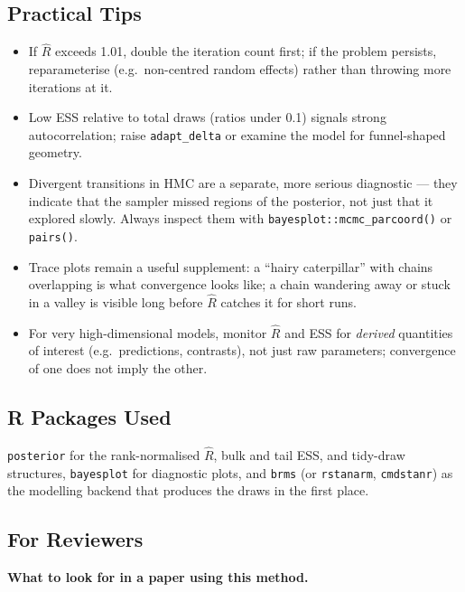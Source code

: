 \documentclass[
]{article}
\providecommand{\tightlist}{%
  \setlength{\itemsep}{0pt}\setlength{\parskip}{0pt}}
\begin{document}
\subsection{Practical Tips}\label{practical-tips}

\begin{itemize}
\tightlist
\item
  If \(\hat R\) exceeds 1.01, double the iteration count first; if the
  problem persists, reparameterise (e.g.~non-centred random effects)
  rather than throwing more iterations at it.
\item
  Low ESS relative to total draws (ratios under 0.1) signals strong
  autocorrelation; raise \texttt{adapt\_delta} or examine the model for
  funnel-shaped geometry.
\item
  Divergent transitions in HMC are a separate, more serious diagnostic
  --- they indicate that the sampler missed regions of the posterior,
  not just that it explored slowly. Always inspect them with
  \texttt{bayesplot::mcmc\_parcoord()} or \texttt{pairs()}.
\item
  Trace plots remain a useful supplement: a ``hairy caterpillar'' with
  chains overlapping is what convergence looks like; a chain wandering
  away or stuck in a valley is visible long before \(\hat R\) catches it
  for short runs.
\item
  For very high-dimensional models, monitor \(\hat R\) and ESS for
  \emph{derived} quantities of interest (e.g.~predictions, contrasts),
  not just raw parameters; convergence of one does not imply the other.
\end{itemize}

\subsection{R Packages Used}\label{r-packages-used}

\texttt{posterior} for the rank-normalised \(\hat R\), bulk and tail
ESS, and tidy-draw structures, \texttt{bayesplot} for diagnostic plots,
and \texttt{brms} (or \texttt{rstanarm}, \texttt{cmdstanr}) as the
modelling backend that produces the draws in the first place.

\subsection{For Reviewers}\label{for-reviewers}

\textbf{What to look for in a paper using this method.}
\end{document}

